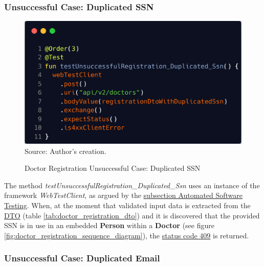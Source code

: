 \subsubsection{Unsuccessful Case: Duplicated SSN}

\begin{figure}[H]
	\centering
	\caption{Doctor Registration Unsuccessful Case: Duplicated SSN}
	\includegraphics[width=1\linewidth]{figures/doctor_registration_unsucessful_integration_test_duplicated_ssn.png}
	\\ \footnotesize Source: Author's creation.
	\label{fig:doctor_registration_unsucessful_integration_test_duplicated_ssn}
\end{figure}

The method \textit{testUnsuccessfulRegistration\_Duplicated\_Ssn} uses an instance of the framework \textit{WebTestClient}, as argued by the \hyperref[subsection:automated_software_testing]{subsection Automated Software Testing}. When, at the moment that validated input data is extracted from the \hyperref[appendix:glossary]{DTO} (table \ref{tab:doctor_registration_dto}) and it is discovered that the provided SSN is in use in an embedded \textbf{Person} within a \textbf{Doctor} (see figure \ref{fig:doctor_registration_sequence_diagram}), the \hyperref[tab:summary_http_status_codes]{status code 409} is returned.


\subsubsection{Unsuccessful Case: Duplicated Email}

